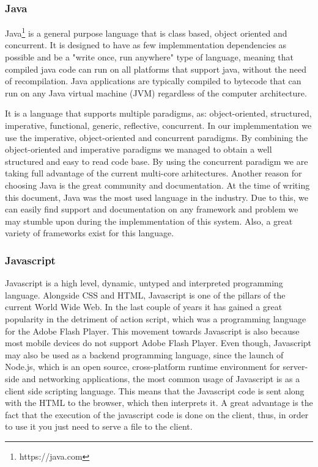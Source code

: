 \subsubsection{Java}
\label{sec:programming-languages-java}
Java\footnote{https://java.com} is a general purpose language that is class based, object oriented and concurrent. 
It is designed to have as few implemmentation dependencies as possible and be a "write once, run anywhere" type of language, meaning that compiled java code can run on all platforms that support java, without the need of recompilation.
Java applications are typically compiled to bytecode that can run on any Java virtual machine (JVM) regardless of the computer architecture.

It is a language that supports multiple paradigms, as:  object-oriented, structured, imperative, functional, generic, reflective, concurrent. In our implemmentation we use the imperative, object-oriented and concurrent paradigms. By combining the object-oriented and imperative paradigms we managed to obtain a well structured and easy to read code base. By using the concurrent paradigm we are taking full advantage of the current multi-core arhitectures.
Another reason for choosing Java is the great community and documentation. At the time of writing this document, Java was the most used language in the industry. Due to this, we can easily find support and documentation on any framework and problem we may stumble upon during the implemmentation of this system. Also, a great variety of frameworks exist for this language.

\subsubsection{Javascript}
\label{sec:programming-languages-javascript}
Javascript is a high level, dynamic, untyped and interpreted programming language. Alongside CSS and HTML, Javascript is one of the pillars of the current World Wide Web. In the last couple of years it has gained a great popularity in the detriment of action script, which was a programming language for the Adobe Flash Player. This movement towards Javascript is also because most mobile devices do not support Adobe Flash Player.
Even though, Javascript may also be used as a backend programming language, since the launch of Node.js, which is  an open source, cross-platform runtime environment for server-side and networking applications, the most common usage of Javascript is as a client side scripting language. This means that the Javascript code is sent along with the HTML to the browser, which then interprets it. A great advantage is the fact that the execution of the javascript code is done on the client, thus, in order to use it you just need to serve a file to the client.


